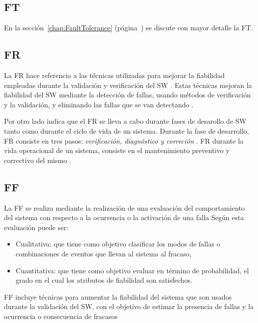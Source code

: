 
\subsection{\acl{FT}}
En la sección~\ref{chap:FaultTolerance} (página~\pageref{chap:FaultTolerance}) se discute con
mayor detalle la \ac{FT}.

\subsection{\acl{FR}}
La \ac{FR} hace referencia a las técnicas utilizadas para mejorar la fiabilidad empleadas durante
la validación y verificación del \ac{SW} \citep{Pullum01}. Estas técnicas mejoran la fiabilidad del
\ac{SW} mediante la detección de fallas, usando métodos de verificación y la validación, y
eliminando las fallas que se van detectando \citep{Pullum01}.

Por otro lado \cite{FTDesign} indica que el \ac{FR} se lleva a cabo durante fases de desarollo de
\ac{SW} tanto como durante el ciclo de vida de un sistema. Durante la fase de desarrollo, \ac{FR}
consiste en tres pasos: \textit{verificación, diagnóstico y correción} \citep{FTDesign}. \ac{FR}
durante la vida operacional de un sistema, consiste en el mantenimiento preventivo y correctivo del
mismo \citep{FTDesign}.

\subsection{\acl{FF}}
La \ac{FF} se realiza mediante la realización de una evaluación del comportamiento del sistema con
respecto a la ocurrencia o la activación de una falla Según \cite{FTDesign} esta evaluación puede ser:
\begin{itemize}
 \item Cualitativa: que tiene como objetivo clasificar los modos de fallas o combinaciones de
eventos que llevan al sistema al fracaso,
 \item Cuantitativa: que tiene como objetivo evaluar en término de probabilidad, el grado en el
cual los atributos de fiabilidad son satisfechos.
\end{itemize}

\ac{FF} incluye técnicas para aumentar la fiabilidad del sistema que son usados durante la
validación del \ac{SW}, con el objetivo de estimar la presencia de fallas y la ocurrencia o
consecuencia de fracasos \citep{Pullum01}


